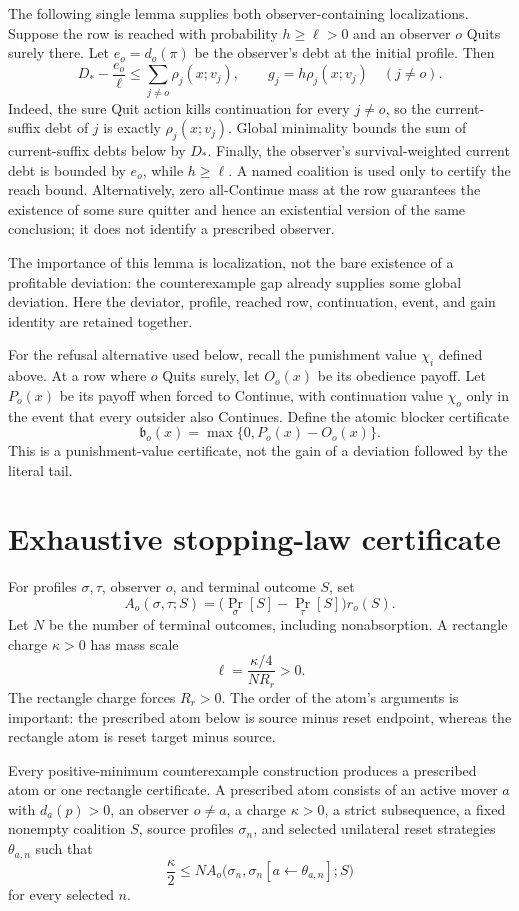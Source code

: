 \documentclass[11pt]{article}
\begin{document}
The following single lemma supplies both observer-containing localizations.  Suppose
the row is reached with probability $h\ge\ell>0$ and an observer $o$ Quits
surely there.  Let
$e_o=d_o(\pi)$ be the observer's debt at the initial profile.  Then
\[
 \boxed{
 D_*-\frac{e_o}{\ell}
 \le\sum_{j\ne o}\rho_j(x;v_j),
 \qquad
 g_j=h\rho_j(x;v_j)\quad(j\ne o).}
\]
Indeed, the sure Quit action kills continuation for every $j\ne o$, so the
current-suffix debt of $j$ is exactly $\rho_j(x;v_j)$.  Global minimality bounds
the sum of current-suffix debts below by $D_*$.  Finally, the observer's
survival-weighted current debt is bounded by $e_o$, while $h\ge\ell$.  A
named coalition is used only to certify the reach bound.  Alternatively,
zero all-Continue mass at the row guarantees the existence of some sure
quitter and hence an existential version of the same conclusion; it does not
identify a prescribed observer.

The importance of this lemma is localization, not the bare existence of a
profitable deviation: the counterexample gap already supplies some global
deviation.  Here the deviator, profile, reached row, continuation, event, and
gain identity are retained together.

For the refusal alternative used below, recall the punishment value $\chi_i$
defined above.
At a row where $o$ Quits surely, let $O_o(x)$ be its obedience payoff.  Let
$P_o(x)$ be its payoff when forced to Continue, with continuation value
$\chi_o$ only in the event that every outsider also Continues.  Define the
atomic blocker certificate
\[
 \mathfrak b_o(x)=\max\{0,P_o(x)-O_o(x)\}.
\]
This is a punishment-value certificate, not the gain of a deviation followed
by the literal tail.

\section{Exhaustive stopping-law certificate}

For profiles $\sigma,\tau$, observer $o$, and terminal outcome $S$, set
\[
 A_o(\sigma,\tau;S)
 =\bigl(\Pr_\sigma[S]-\Pr_\tau[S]\bigr)r_o(S).
\]
Let $N$ be the number of terminal outcomes, including nonabsorption.  A
rectangle charge $\kappa>0$ has mass scale
\[
 \ell=\frac{\kappa/4}{NR_r}>0.
\]
The rectangle charge forces $R_r>0$.  The order of the atom's arguments is
important: the prescribed atom below is source minus reset endpoint, whereas
the rectangle atom is reset target minus source.

Every positive-minimum counterexample construction produces a prescribed
atom or one rectangle certificate.  A prescribed atom consists of an active mover
$a$ with $d_a(p)>0$, an observer $o\ne a$, a charge $\kappa>0$, a strict
subsequence, a fixed nonempty coalition $S$, source profiles $\sigma_n$, and
selected unilateral reset strategies $\theta_{a,n}$ such that
\[
 \frac{\kappa}{2}
 \le N A_o\bigl(\sigma_n,
       \sigma_n[a\leftarrow\theta_{a,n}];S\bigr)
\]
for every selected $n$.
\end{document}
